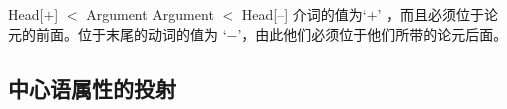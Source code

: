 \eal
\ex\label{lp-ini-arg} 
Head[\initial$+$] $<$ Argument
\ex 
Argument $<$ Head[\initial --]
\zl
介词的\initial 值为`$+$' ，而且必须位于论元的前面。位于末尾的动词的值为 `$-$'，由此他们必须位于他们所带的论元后面。
\eal
{}
\ex[*]{
\gll {}[[den Schrank] in]\\
     \hspaceThis{[[}\textsc{det} 壁橱 \textsc{prep}\\
}
\zl

\subsection{中心语属性的投射}
\label{Abschnitt-Kopfeigenschaften}

